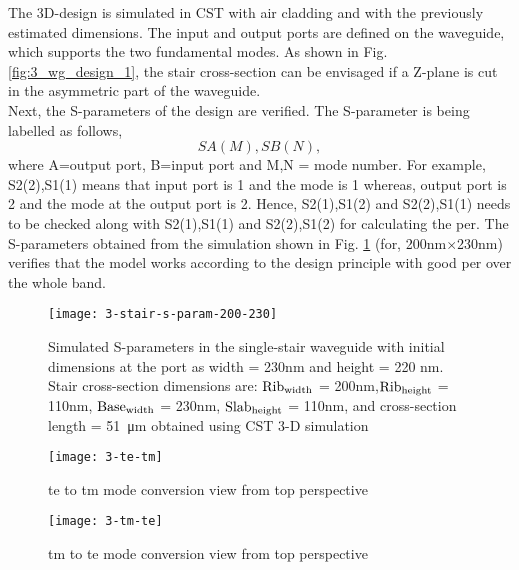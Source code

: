 \documentclass[../report.tex]{subfiles}
\begin{document}
\noindent The 3D-design is simulated in CST with air cladding and with the previously estimated dimensions. The input and output ports are defined on the waveguide, which supports the two fundamental modes. As shown in Fig. \ref{fig:3_wg_design_1}, the stair cross-section can be envisaged if a Z-plane is cut in the asymmetric part of the waveguide.\\

\noindent Next, the S-parameters of the design are verified. The S-parameter is being labelled as follows,
\begin{equation}\label{eq:s_parameter_label}
SA(M),SB(N),
\end{equation}
where A=output port, B=input port and M,N = mode number. For example, S2(2),S1(1) means that input port is 1 and the mode is 1 whereas, output port is 2 and the mode at the output port is 2. Hence, S2(1),S1(2) and S2(2),S1(1) needs to be checked along with S2(1),S1(1) and S2(2),S1(2) for calculating the \gls{per}. The S-parameters obtained from the simulation shown in Fig. \ref{fig:3_stair_s_param_200_230} (for, 200nm$\times$230nm) verifies that the model works according to the design principle with good \gls{per} over the whole band. 


\begin{figure}[H] %
	\centering
	\texttt{[image: 3-stair-s-param-200-230]}
	\caption{Simulated S-parameters in the single-stair waveguide with initial dimensions at the port as width = 230nm and height = 220 nm. Stair cross-section dimensions are: $\mathrm{Rib_{width}}$ = 200nm,$\mathrm{Rib_{height}}$ = 110nm, $\mathrm{Base_{width}}$ = 230nm, $\mathrm{Slab_{height}}$ = 110nm, and cross-section length = \SI{51}{\micro\meter} obtained using CST 3-D simulation}
	\label{fig:3_stair_s_param_200_230}
\end{figure}

\begin{figure}[H] %
	\centering
	\texttt{[image: 3-te-tm]}
	\caption{\gls{te} to \gls{tm} mode conversion view from top perspective}
	\label{fig:3_te_tm}
\end{figure}

\begin{figure}[H] %
	\centering
	\texttt{[image: 3-tm-te]}
	\caption{\gls{tm} to \gls{te} mode conversion view from top perspective}
	\label{fig:3_tm_te}
\end{figure}
\end{document}
